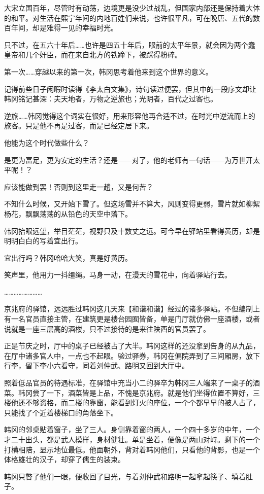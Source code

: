 大宋立国百年，尽管时有动荡，边境更是没少过战乱，但国家内部还是保持着大体的和平。对生活在熙宁年间的内地百姓们来说，也许很平凡，可在晚唐、五代的数百年间，却是难得一见的幸福时光。

只不过，在五六十年后……也许是四五十年后，眼前的太平年景，就会因为两个蠢皇帝和几个奸臣，而在来自北方的铁蹄下，被踩得粉碎。

第一次……穿越以来的第一次，韩冈思考着他来到这个世界的意义。

记得前些日子闲暇时读得《李太白文集》，诗句读过便罢，但其中的一段序文却让韩冈铭记甚深：夫天地者，万物之逆旅也；光阴者，百代之过客也。

逆旅……韩冈觉得这个词实在很好，用来形容他再合适不过，在时光中逆流而上的旅客。只是他不再是过客，而是已经定居下来。

他能为这个时代做些什么？

是更为富足，更为安定的生活？还是——对了，他的老师有一句话——为万世开太平呢！？

应该能做到罢！否则到这里走一趟，又是何苦？

不知什么时候，又开始下雪了。但这场雪并不算大，风则变得更弱，雪片就如柳絮杨花，飘飘荡荡的从铅色的天空中落下。

韩冈抬眼远望，举目茫茫，视野只及十数丈之远。可今早在驿站里看得黄历，却是明明白白的写着宜出行。

宜出行吗？韩冈哈哈大笑，真是好黄历。

笑声里，他用力一抖缰绳。马身一动，在漫天的雪花中，向着驿站行去。

……………………

京兆府的驿馆，远远胜过韩冈这几天来【和谐和谐】经过的诸多驿站。不但编制上有一名官员直接主管，在建筑更是楼台园囿皆备，单是门厅就仿佛一座酒楼，或者说就是一座三层高的酒楼，只不过接待的是来往陕西的官员罢了。

正是节庆之时，厅中的桌子已经被占了大半。韩冈这样的还没拿到告身的从九品，在厅中诸多官人中，一点也不起眼。验过驿券，韩冈在偏院弄到了三间厢房，放下行李，留下李小六看守，同着刘仲武、路明又回到大厅中。

照着低品官员的待遇标准，在驿馆中充当小二的驿卒为韩冈三人端来了一桌子的酒菜。韩冈尝了一下，酒菜皆是上品，不愧是京兆府。就是他们坐得位置不算好，三楼他还不够资格，而二楼的靠窗，能看到灯火的座位，一个个都早早的被人占了，只能找了个近着楼梯口的角落坐下。

韩冈的邻桌贴着窗子，坐了三人。身侧靠着窗的两人，一个四十多岁的中年，一个才二十出头，都是武人模样，身材健壮。单是坐着，便像是两山对峙。剩下的一个打横相陪，显示地位最低。他面朝外，背对着韩冈他们，只看他的背影，也是一个体格雄壮的汉子，却穿了儒生的装束。

韩冈只瞥了他们一眼，便收回了目光，与着刘仲武和路明一起拿起筷子、填着肚子。

